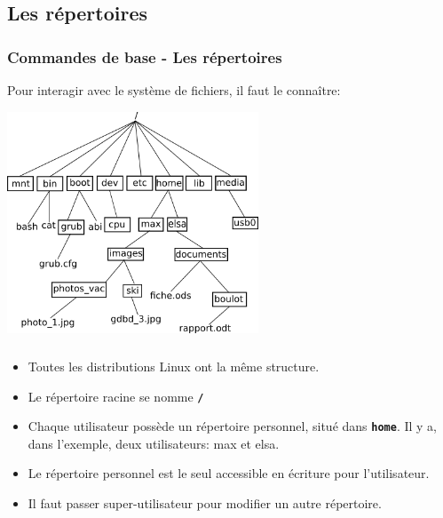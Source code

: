 \documentclass[svgnames,11pt]{beamer}
\begin{document}
\subsection{Les répertoires}
\begin{frame}
    \frametitle{Commandes de base - Les répertoires}

    Pour interagir avec le système de fichiers, il faut le connaître:

\begin{center}
\centering
\includegraphics[width=7.5cm]{ressources/arbre-linux.png}
\label{IMG}
\end{center}
\end{frame}
\begin{frame}
    \frametitle{}

    \begin{aretenir}[]
    \begin{itemize}
        \item Toutes les distributions Linux ont la même structure.
        \item Le répertoire racine se nomme \textbf{\texttt{/}}
        \item Chaque utilisateur possède un répertoire personnel, situé dans \textbf{\texttt{home}}. Il y a, dans l'exemple, deux utilisateurs: max et elsa.
        \item Le répertoire personnel est le seul accessible en écriture pour l'utilisateur.
        \item Il faut passer super-utilisateur pour modifier un autre répertoire.
    \end{itemize}
    \end{aretenir}

\end{frame}
\end{document}
